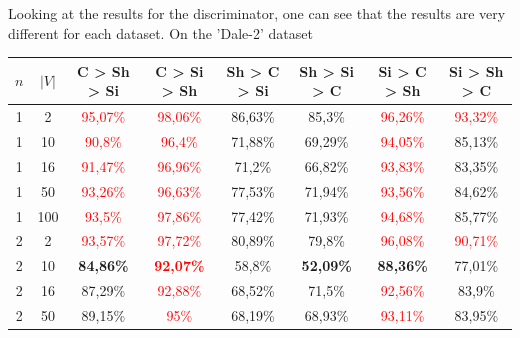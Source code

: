 Looking at the results for the discriminator, one can see that the results are very different for each dataset.
On the 'Dale-2' dataset

\begin{table}[ht]
    \centering
    \begin{tabular}{cc|c|c|c|c|c|c}
        \toprule
        $n$ & $|V|$ & \textbf{C > Sh > Si}     & \textbf{C > Si > Sh}              & \textbf{Sh > C > Si}     & \textbf{Sh > Si > C}     & \textbf{Si > C > Sh}     & \textbf{Si > Sh > C}     \\\midrule
        {1} & {2}   & \textcolor{red}{95,07\%} & \textcolor{red}{98,06\%}          & {86,63\%}                & {85,3\%}                 & \textcolor{red}{96,26\%} & \textcolor{red}{93,32\%} \\
        {1} & {10}  & \textcolor{red}{90,8\%}  & \textcolor{red}{96,4\%}           & {71,88\%}                & {69,29\%}                & \textcolor{red}{94,05\%} & {85,13\%}                \\
        {1} & {16}  & \textcolor{red}{91,47\%} & \textcolor{red}{96,96\%}          & {71,2\%}                 & {66,82\%}                & \textcolor{red}{93,83\%} & {83,35\%}                \\
        {1} & {50}  & \textcolor{red}{93,26\%} & \textcolor{red}{96,63\%}          & {77,53\%}                & {71,94\%}                & \textcolor{red}{93,56\%} & {84,62\%}                \\
        {1} & {100} & \textcolor{red}{93,5\%}  & \textcolor{red}{97,86\%}          & {77,42\%}                & {71,93\%}                & \textcolor{red}{94,68\%} & {85,77\%}                \\
        {2} & {2}   & \textcolor{red}{93,57\%} & \textcolor{red}{97,72\%}          & {80,89\%}                & {79,8\%}                 & \textcolor{red}{96,08\%} & \textcolor{red}{90,71\%} \\
        {2} & {10}  & \textbf{84,86\%}         & \textcolor{red}{\textbf{92,07\%}} & {58,8\%}                 & \textbf{52,09\%}         & \textbf{88,36\%}         & {77,01\%}                \\
        {2} & {16}  & {87,29\%}                & \textcolor{red}{92,88\%}          & {68,52\%}                & {71,5\%}                 & \textcolor{red}{92,56\%} & {83,9\%}                 \\
        {2} & {50}  & {89,15\%}                & \textcolor{red}{95\%}             & {68,19\%}                & {68,93\%}                & \textcolor{red}{93,11\%} & {83,95\%}                \\

\end{tabular}
\end{table}
